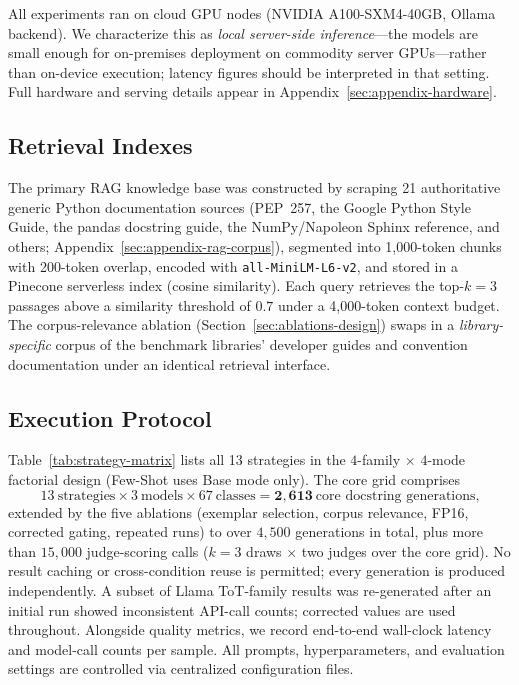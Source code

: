 \documentclass[pdflatex,sn-mathphys-ay]{sn-jnl}%
\theoremstyle{thmstyleone}%
\theoremstyle{thmstyletwo}%
\theoremstyle{thmstylethree}%
\begin{document}
All experiments ran on cloud GPU nodes (NVIDIA A100-SXM4-40GB, Ollama backend). We characterize this as \emph{local server-side inference}---the models are small enough for on-premises deployment on commodity server GPUs---rather than on-device execution; latency figures should be interpreted in that setting. Full hardware and serving details appear in Appendix~\ref{sec:appendix-hardware}.

\subsection{Retrieval Indexes}
\label{sec:retrieval-index}
The primary RAG knowledge base was constructed by scraping 21 authoritative generic Python documentation sources (PEP~257, the Google Python Style Guide, the pandas docstring guide, the NumPy/Napoleon Sphinx reference, and others; Appendix~\ref{sec:appendix-rag-corpus}), segmented into 1,000-token chunks with 200-token overlap, encoded with \texttt{all-MiniLM-L6-v2}, and stored in a Pinecone serverless index (cosine similarity). Each query retrieves the top-$k=3$ passages above a similarity threshold of $0.7$ under a 4,000-token context budget. The corpus-relevance ablation (Section~\ref{sec:ablations-design}) swaps in a \emph{library-specific} corpus of the benchmark libraries' developer guides and convention documentation under an identical retrieval interface.

\subsection{Execution Protocol}
\label{sec:protocol}
Table~\ref{tab:strategy-matrix} lists all 13 strategies in the $4$-family $\times$ $4$-mode factorial design (Few-Shot uses Base mode only). The core grid comprises
\[ 13\ \text{strategies} \times 3\ \text{models} \times 67\ \text{classes} = \mathbf{2{,}613}\ \text{core docstring generations,} \]
extended by the five ablations (exemplar selection, corpus relevance, FP16, corrected gating, repeated runs) to over $4{,}500$ generations in total, plus more than $15{,}000$ judge-scoring calls ($k{=}3$ draws $\times$ two judges over the core grid). No result caching or cross-condition reuse is permitted; every generation is produced independently. A subset of Llama ToT-family results was re-generated after an initial run showed inconsistent API-call counts; corrected values are used throughout. Alongside quality metrics, we record end-to-end wall-clock latency and model-call counts per sample. All prompts, hyperparameters, and evaluation settings are controlled via centralized configuration files.
\end{document}
